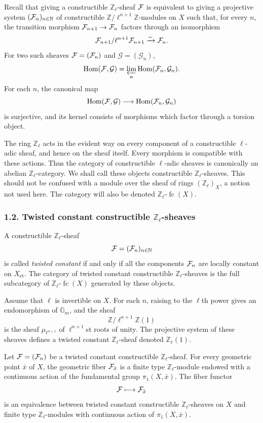 \documentclass[11pt]{article}
\theoremstyle{plain}
\theoremstyle{definition}
\theoremstyle{remark}
\newcommand{\bN}{\mathbb N}
\newcommand{\bZ}{\mathbb Z}
\newcommand{\cG}{\mathcal G}\newcommand{\cH}{\mathcal H}\newcommand{\cI}{\mathcal I}
\DeclareMathOperator{\Hom}{Hom}
\providecommand{\fc}{\operatorname{fc}}
\begin{document}
Recall that giving a constructible $\bZ_\ell$-sheaf $\mathcal F$ is equivalent to giving a
projective system $(\cF_n)_{n\in\bN}$ of constructible
$\bZ/\ell^{n+1}\bZ$-modules on $X$ such that, for every $n$, the transition morphism
$\mathcal F_{n+1}\to\mathcal F_n$ factors through an isomorphism
\[
       \mathcal F_{n+1}/\ell^{n+1}\mathcal F_{n+1}\xrightarrow{\sim}\mathcal F_n.
\]
For two such sheaves $\mathcal F=(\mathcal F_n)$ and $\cG=(\cG_n)$,
\[
       \Hom(\cF,\cG)=\varprojlim_n\Hom(\cF_n,\cG_n).
\]
For each $n$, the canonical map
\[
       \Hom(\cF,\cG)\longrightarrow\Hom(\cF_n,\cG_n)
\]
is surjective, and its kernel consists of morphisms which factor through a torsion
object.

The ring $\bZ_\ell$ acts in the evident way on every component of a constructible
$\ell$-adic sheaf, and hence on the sheaf itself. Every morphism is compatible with
these actions. Thus the category of constructible $\ell$-adic sheaves is canonically
an abelian $\bZ_\ell$-category. We shall call these objects constructible
$\bZ_\ell$-sheaves. This should not be confused with a module over the sheaf of
rings $(\bZ_\ell)_X$, a notion not used here. The category will also be denoted
$\bZ_\ell\text{-}\fc(X)$.

\subsubsection*{1.2. Twisted constant constructible $\bZ_\ell$-sheaves}

A constructible $\bZ_\ell$-sheaf
\[
       \cF=(\cF_n)_{n\in\bN}
\]
is called \emph{twisted constant} if and only if all the components $\mathcal F_n$ are
locally constant on $X_{\mathrm{et}}$. The category of twisted constant constructible
$\bZ_\ell$-sheaves is the full subcategory of $\bZ_\ell\text{-}\fc(X)$ generated by
these objects.

Assume that $\ell$ is invertible on $X$. For each $n$, raising to the $\ell$th power
gives an endomorphism of $\mathbb G_m$, and the sheaf
\[
       \bZ/\ell^{n+1}\bZ(1)
\]
is the sheaf $\mu_{\ell^{n+1}}$ of $\ell^{n+1}$st roots of unity. The projective
system of these sheaves defines a twisted constant $\bZ_\ell$-sheaf denoted
$\bZ_\ell(1)$.

Let $\mathcal F=(\mathcal F_n)$ be a twisted constant constructible $\bZ_\ell$-sheaf. For every
geometric point $\bar x$ of $X$, the geometric fiber $\mathcal F_{\bar x}$ is a finite type
$\bZ_\ell$-module endowed with a continuous action of the fundamental group
$\pi_1(X,\bar x)$. The fiber functor
\[
       \mathcal F\longmapsto\mathcal F_{\bar x}
\]
is an equivalence between twisted constant constructible $\bZ_\ell$-sheaves on $X$
and finite type $\bZ_\ell$-modules with continuous action of $\pi_1(X,\bar x)$.
\end{document}

